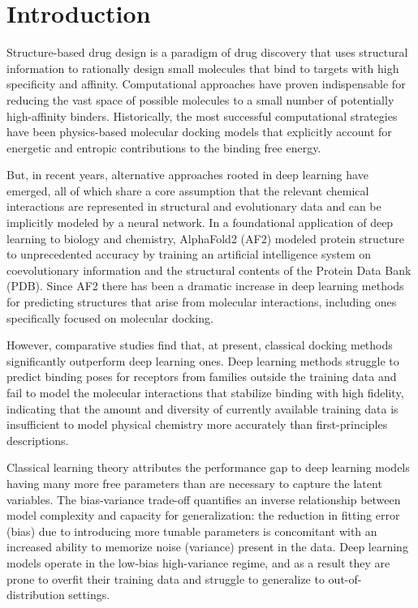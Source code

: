 \documentclass[%
 aip,
 amsmath,amssymb,
reprint,%
]{revtex4-1}
\begin{document}
\section{Introduction}
Structure-based drug design is a paradigm of drug discovery that uses structural information to rationally design small molecules that bind to targets with high specificity and affinity. \cite{anderson2003process} Computational approaches have proven indispensable for reducing the vast space of possible molecules to a small number of potentially high-affinity binders.\cite{shoichet2004virtual,pagadala2017software,klarich2024thompson} Historically, the most successful computational strategies have been physics-based molecular docking models that explicitly account for energetic\cite{trott2010autodock,verdonk2003gold,friesner2004glide,allen2015dock} and entropic\cite{murphy2016wscore} contributions to the binding free energy. 

But, in recent years, alternative approaches rooted in deep learning have emerged, all of which share a core assumption that the relevant chemical interactions are represented in structural and evolutionary data and can be implicitly modeled by a neural network. In a foundational application of deep learning to biology and chemistry, AlphaFold2 (AF2) modeled protein structure to unprecedented accuracy by training an artificial intelligence system on coevolutionary information and the structural contents of the Protein Data Bank (PDB).\cite{jumper2021af2} Since AF2 there has been a dramatic increase in deep learning methods for predicting structures that arise from molecular interactions\cite{krishna2024rfaa,abramson2024af3}, including ones specifically focused on molecular docking. \cite{corso2022diffdock,qiao2024neuralplexer} 

However, comparative studies find that, at present, classical docking methods significantly outperform deep learning ones.\cite{buttenschoen2024posebusters} Deep learning methods struggle to predict binding poses for receptors from families outside the training data\cite{buttenschoen2024posebusters} and fail to model the molecular interactions that stabilize binding with high fidelity\cite{errington2024plif}, indicating that the amount and diversity of currently available training data is insufficient to model physical chemistry more accurately than first-principles descriptions.

Classical learning theory attributes the performance gap to deep learning models having many more free parameters than are necessary to capture the latent variables. The bias-variance trade-off quantifies an inverse relationship between model complexity and capacity for generalization: the reduction in fitting error (bias) due to introducing more tunable parameters  is concomitant with an increased ability to memorize noise (variance) present in the data.\cite{geman1992neural} Deep learning models operate in the low-bias high-variance regime, and as a result they are prone to overfit their training data and struggle to generalize to out-of-distribution settings.\cite{yoon2023diffusion}
\end{document}
